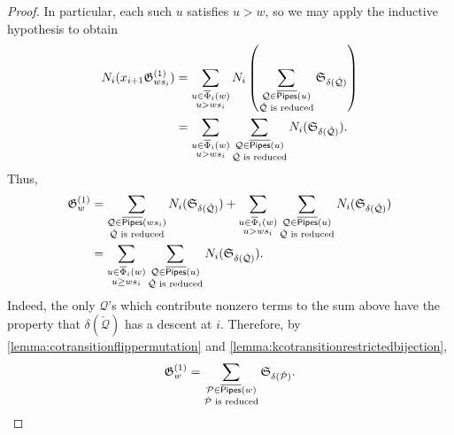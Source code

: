 \documentclass[12 pt]{amsart}
\numberwithin{equation}{section}
\theoremstyle{remark}
\newcommand{\kpipes}{\overline{\sf Pipes}}
\newcommand{\demprod}{\delta}
\newcommand{\divdiff}{N}
\newcommand{\kcotransitionperms}{\overline{\Phi}}
\begin{document}
\begin{proof}
			In particular, each such $u$ satisfies $u > w$, so we may apply the inductive hypothesis to obtain 
			\begin{align*}
				\divdiff_i( x_{i + 1}\mathfrak{G}_{ws_i}^{(1)})
				&= \sum_{\substack{u \in\kcotransitionperms_{i}(w)\\u > ws_i}} \divdiff_i\left(\sum_{\substack{\mathcal{Q} \in \kpipes(u)\\ 
						\check{\mathcal{Q}} \text{ is reduced}}}\mathfrak{S}_{\demprod(\check{\mathcal{Q}})}\right) \\
				& = \sum_{\substack{u \in\kcotransitionperms_{i}(w)\\u > ws_i}} \sum_{\substack{\mathcal{Q} \in \kpipes(u)\\ 
				\check{\mathcal{Q}} \text{ is reduced}}}\divdiff_i(\mathfrak{S}_{\demprod(\check{\mathcal{Q}})}).
			\end{align*}
			Thus,
			\begin{align*}
				\mathfrak{G}_w^{(1)}& = \sum_{\substack{\mathcal{Q} \in \kpipes(ws_i)\\ \check{\mathcal{Q}} \text{ is reduced}}}\divdiff_i(\mathfrak{S}_{\demprod(\check{\mathcal{Q}})}) + \sum_{\substack{u \in\kcotransitionperms_{i}(w)\\u > ws_i}} \sum_{\substack{\mathcal{Q} \in \kpipes(u)\\ \check{\mathcal{Q}} \text{ is reduced}}}\divdiff_i(\mathfrak{S}_{\demprod(\check{\mathcal{Q}})})\\
				& = \sum_{\substack{u \in\kcotransitionperms_{i}(w)\\u\geq ws_i}} \sum_{\substack{\mathcal{Q} \in \kpipes(u)\\ \check{\mathcal{Q}} \text{ is reduced}}}\divdiff_i(\mathfrak{S}_{\demprod(\check{\mathcal{Q}})}).
			\end{align*}
			Indeed, the only $\mathcal{Q}$'s which contribute nonzero terms to the sum above have the property that $\demprod(\check{\mathcal{Q}})$ has a descent at $i$. 
			Therefore, by \cref{lemma:cotransitionflippermutation} and \cref{lemma:kcotransitionrestrictedbijection},
			\[\mathfrak{G}_w^{(1)} = \sum_{\substack{\mathcal{P} \in \kpipes(w)\\ \check{\mathcal{P}} \text{ is reduced}}}\mathfrak{S}_{\demprod(\check{\mathcal{P}})}. \qedhere\]
		\end{proof}
	
\end{document}
